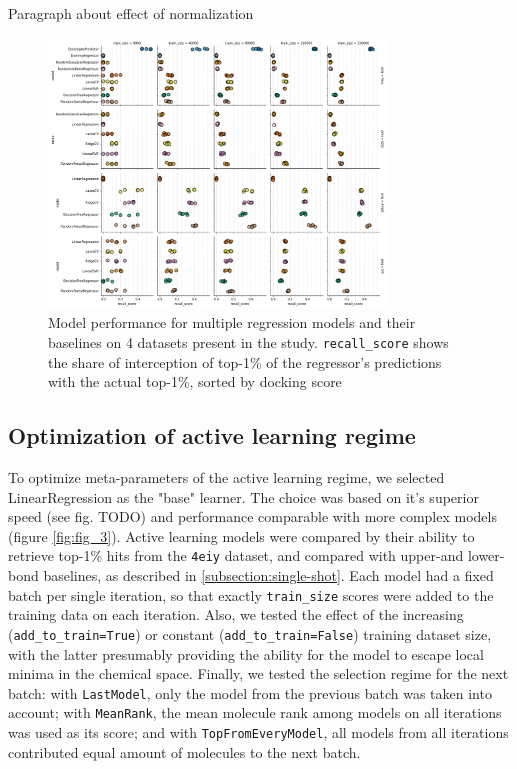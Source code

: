 Paragraph about effect of normalization

\begin{figure}[h]
\centering
\includegraphics[width=0.8\textwidth]{figures/Figure_4.png}
\caption{Model performance for multiple regression models and their baselines on 4 datasets present in the study. \texttt{recall\_score} shows the share of interception of top-1\% of the regressor's predictions with the actual top-1\%, sorted by docking score}
\label{fig:fig_4}
\end{figure}

\subsection{Optimization of active learning regime}

To optimize meta-parameters of the active learning regime, we selected LinearRegression as the "base" learner. The choice was based on it's superior speed (see fig. TODO) and performance comparable with more complex models (figure \ref{fig:fig_3}). Active learning models were compared by their ability to retrieve top-1\% hits from the \texttt{4eiy} dataset, and compared with upper-and lower-bond baselines, as described in \ref{subsection:single-shot}. Each model had a fixed batch per single iteration, so that exactly \texttt{train\_size} scores were added to the training data on each iteration. Also, we tested the effect of the increasing (\texttt{add\_to\_train=True}) or constant (\texttt{add\_to\_train=False}) training dataset size, with the latter presumably providing the ability for the model to escape local minima in the chemical space. Finally, we tested the selection regime for the next batch: with \texttt{LastModel}, only the model from the previous batch was taken into account; with \texttt{MeanRank}, the mean molecule rank among models on all iterations was used as its score; and with \texttt{TopFromEveryModel}, all models from all iterations contributed equal amount of molecules to the next batch.


